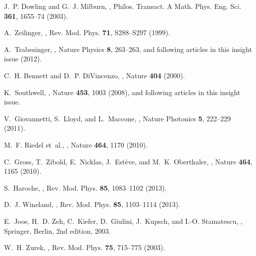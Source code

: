 \documentclass[11pt]{article}
\begin{document}
\begin{thebibliography}{100}

J.~P. Dowling and G.~J. Milburn,
,
\newblock Philos. Transact. A Math. Phys. Eng. Sci. {\bf 361}, 1655--74 (2003).

A.~Zeilinger,
,
\newblock Rev. Mod. Phys. {\bf 71}, S288–S297 (1999).

A.~Trabesinger,
,
\newblock Nature Physics {\bf 8}, 263--263, and following articles in this
  insight issue (2012).

C.~H. Bennett and D.~P. DiVincenzo,
,
\newblock Nature {\bf 404} (2000).

K.~Southwell,
,
\newblock Nature {\bf 453}, 1003 (2008),
\newblock and following articles in this insight issue.

V.~Giovannetti, S.~Lloyd, and L.~Maccone,
,
\newblock Nature Photonics {\bf 5}, 222--229 (2011).

M.~F. Riedel et~al.,
,
\newblock Nature {\bf 464}, 1170 (2010).

C.~Gross, T.~Zibold, E.~Nicklas, J.~Est\`{e}ve, and M.~K. Oberthaler,
,
\newblock Nature {\bf 464}, 1165 (2010).

S.~Haroche,
,
\newblock Rev. Mod. Phys. {\bf 85}, 1083--1102 (2013).

D.~J. Wineland,
,
\newblock Rev. Mod. Phys. {\bf 85}, 1103--1114 (2013).

E.~Joos, H.~D. Zeh, C.~Kiefer, D.~Giulini, J.~Kupsch, and I.-O. Stamatescu,
,
\newblock Springer, Berlin, 2nd edition, 2003.

W.~H. Zurek,
,
\newblock Rev. Mod. Phys. {\bf 75}, 715--775 (2003).


\end{thebibliography}
\end{document}
